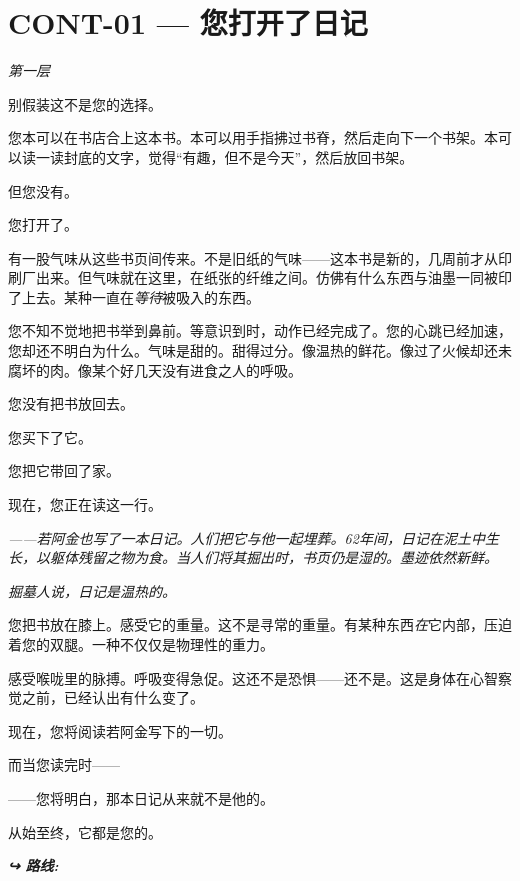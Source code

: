 \section*{\textbf{CONT-01} --- 您打开了日记}

\noindent \textit{第一层}

\noindent 别假装这不是您的选择。

\noindent 您本可以在书店合上这本书。本可以用手指拂过书脊，然后走向下一个书架。本可以读一读封底的文字，觉得\textquotedblleft{}有趣，但不是今天\textquotedblright{}，然后放回书架。

\noindent 但您没有。

\noindent 您打开了。

\noindent 有一股气味从这些书页间传来。不是旧纸的气味——这本书是新的，几周前才从印刷厂出来。但气味就在这里，在纸张的纤维之间。仿佛有什么东西与油墨一同被印了上去。某种一直在\textit{等待}被吸入的东西。

\noindent 您不知不觉地把书举到鼻前。等意识到时，动作已经完成了。您的心跳已经加速，您却还不明白为什么。气味是甜的。甜得过分。像温热的鲜花。像过了火候却还未腐坏的肉。像某个好几天没有进食之人的呼吸。

\noindent 您没有把书放回去。

\noindent 您买下了它。

\noindent 您把它带回了家。

\noindent 现在，您正在读这一行。

\noindent \textit{——若阿金也写了一本日记。人们把它与他一起埋葬。62年间，日记在泥土中生长，以躯体残留之物为食。当人们将其掘出时，书页仍是湿的。墨迹依然新鲜。}

\noindent \textit{掘墓人说，日记是温热的。}

\noindent 您把书放在膝上。感受它的重量。这不是寻常的重量。有某种东西\textit{在}它内部，压迫着您的双腿。一种不仅仅是物理性的重力。

\noindent 感受喉咙里的脉搏。呼吸变得急促。这还不是恐惧——还不是。这是身体在心智察觉之前，已经认出有什么变了。

\noindent 现在，您将阅读若阿金写下的一切。

\noindent 而当您读完时——

\noindent ——您将明白，那本日记从来就不是他的。

\noindent 从始至终，它都是您的。

\vspace{0.5em}
\noindent\textit{\textbf{↪ 路线:}  \rotasep {} \rotasep {}}
